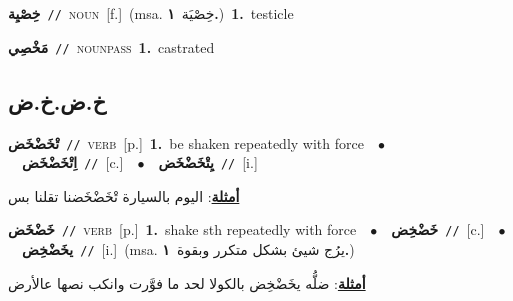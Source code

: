 \documentclass[10pt,a4paper,twoside]{article} %
\begin{document}
\begin{multicols}{2}
{\setlength\topsep{0pt}\textbf{\foreignlanguage{arabic}{خِصْيِة}}\ {\color{gray}\texttt{//}\color{black}}\ \textsc{noun}\ [f.]\ \color{gray}(msa. \foreignlanguage{arabic}{خِصْيَة}~\foreignlanguage{arabic}{\textbf{١.}})\color{black}\ \textbf{1.}~testicle\ } \vspace{2mm}

{\setlength\topsep{0pt}\textbf{\foreignlanguage{arabic}{مَخْصِي}}\ {\color{gray}\texttt{//}\color{black}}\ \textsc{noun\textunderscore pass}\ \textbf{1.}~castrated\ } \vspace{2mm}

\vspace{-3mm}
\subsection*{\color{blue}\foreignlanguage{arabic}{خ.ض.خ.ض}\color{blue}{}} 

{\setlength\topsep{0pt}\textbf{\foreignlanguage{arabic}{تْخَضْخَض}}\ {\color{gray}\texttt{//}\color{black}}\ \textsc{verb}\ [p.]\ \textbf{1.}~be shaken repeatedly with force\ \ $\bullet$\ \ \setlength\topsep{0pt}\textbf{\foreignlanguage{arabic}{اِتْخَضْخَض}}\ {\color{gray}\texttt{//}\color{black}}\ [c.]\ \ $\bullet$\ \ \setlength\topsep{0pt}\textbf{\foreignlanguage{arabic}{يِتْخَضْخَض}}\ {\color{gray}\texttt{//}\color{black}}\ [i.]\  \begin{flushright}\color{gray}\foreignlanguage{arabic}{\textbf{\underline{\foreignlanguage{arabic}{أمثلة}}}: اليوم بالسيارة تْخَضْخَضنا تقلنا بس}\end{flushright}\color{black}} \vspace{2mm}

{\setlength\topsep{0pt}\textbf{\foreignlanguage{arabic}{خَضْخَض}}\ {\color{gray}\texttt{//}\color{black}}\ \textsc{verb}\ [p.]\ \textbf{1.}~shake sth repeatedly with force\ \ $\bullet$\ \ \setlength\topsep{0pt}\textbf{\foreignlanguage{arabic}{خَضْخِض}}\ {\color{gray}\texttt{//}\color{black}}\ [c.]\ \ $\bullet$\ \ \setlength\topsep{0pt}\textbf{\foreignlanguage{arabic}{يخَضْخِض}}\ {\color{gray}\texttt{//}\color{black}}\ [i.]\ \color{gray}(msa. \foreignlanguage{arabic}{يرُج شيئ بشكل متكرر وبقوة}~\foreignlanguage{arabic}{\textbf{١.}})\color{black}\  \begin{flushright}\color{gray}\foreignlanguage{arabic}{\textbf{\underline{\foreignlanguage{arabic}{أمثلة}}}: ضلُّه يخَضْخِض بالكولا لحد ما فوَّرت وانكب نصها عالأرض}\end{flushright}\color{black}} \vspace{2mm}


\end{multicols}
\end{document}
